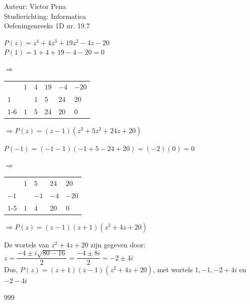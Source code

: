 \documentclass[a4paper]{article}
\begin{document}
	
	\noindent \large Auteur: Victor Pena\\
	\noindent \large Studierichting: Informatica\\
	\noindent \large Oefeningenreeks 1D nr. 19.7\\
	
	\medskip
	
	\normalsize 
	
	$P(z)=z^4 +4z^3 + 19z^2 -4z -20$ \\
	
	$P(1)=1 + 4 + 19 -4 -20 = 0$
	
	\medskip
	
	$\Rightarrow$ \begin{tabular}{l|llll|l}
	  & $1$ & $4$ & $19$ &$-4$ &$-20$ \\
	$1$ &   & $1$ & $5$  &$24$ & $20$ \\  \cline{1-6}
	  & $1$ & $5$ & $24$ &$20$ & $0$
	\end{tabular} $\Rightarrow P(z) = (z-1)(z^3 + 5z^2 + 24z + 20)$
	
	
	\medskip
	
	$P(-1) = (-1-1)(-1  +5 - 24 + 20) = (-2)(0) = 0$  
	
	\medskip
	
	$\Rightarrow$ \begin{tabular}{l|lll|l}
		& $1$ & $5$  & $24$ &$20$ \\
       $-1$&  & $-1$ & $-4$  &$-20$ \\  \cline{1-5}
		& $1$ & $4$  & $20$ &$0$
	\end{tabular} $\Rightarrow P(z) = (z-1)(z+1)(z^2 + 4z + 20)$ 
	
	\medskip
	
	De wortels van $z^2 + 4z + 20$ zijn gegeven door: \\
	
	$z = \dfrac{-4 \pm i\sqrt{80-16}}{2} = \dfrac{-4 \pm 8i}{2} = -2 \pm 4i$\\
	

	Dus, $P(z) = (z+1)(z-1)(z^2 + 4z + 20)$, met wortels $1,-1,-2+4i$ en $-2-4i$
	
	

	
	

	
	
	
	
	\begin{thebibliography}{999}
	\end{thebibliography}
\end{document}
